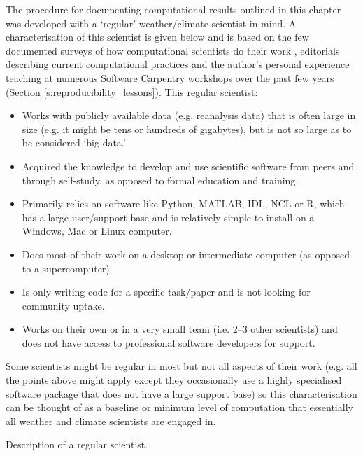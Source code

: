 \begin{featurebox}

\begin{tcolorbox}[width=\textwidth]

The procedure for documenting computational results outlined in this chapter was developed with a `regular' weather/climate scientist in mind. A characterisation of this scientist is given below and is based on the few documented surveys of how computational scientists do their work \citep{Hannay2009,Stodden2010,Momcheva2015}, editorials describing current computational practices \citep[e.g.][]{Easterbrook2014} and the author's personal experience teaching at numerous Software Carpentry workshops over the past few years (Section \ref{s:reproducibility_lessons}). This regular scientist:
\begin{itemize}
\item Works with publicly available data (e.g. reanalysis data) that is often large in size (e.g. it might be tens or hundreds of gigabytes), but is not so large as to be considered `big data.' 
\item Acquired the knowledge to develop and use scientific software from peers and through self-study, as opposed to formal education and training.
\item Primarily relies on software like Python, MATLAB, IDL, NCL or R, which has a large user/support base and is relatively simple to install on a Windows, Mac or Linux computer.
\item Does most of their work on a desktop or intermediate computer (as opposed to a supercomputer).
\item Is only writing code for a specific task/paper and is not looking for community uptake.  
\item Works on their own or in a very small team (i.e. 2--3 other scientists) and does not have access to professional software developers for support.
\end{itemize}

Some scientists might be regular in most but not all aspects of their work (e.g. all the points above might apply except they occasionally use a highly specialised software package that does not have a large support base) so this characterisation can be thought of as a baseline or minimum level of computation that essentially all weather and climate scientists are engaged in.  

\end{tcolorbox}

\caption{\label{box:regular_scientist}
Description of a regular scientist.}
\end{featurebox}


